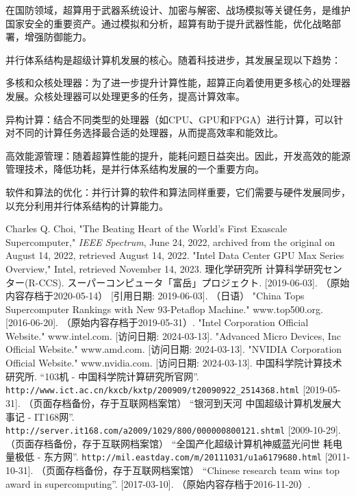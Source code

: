 \documentclass{ctexart}
\begin{document}
在国防领域，超算用于武器系统设计、加密与解密、战场模拟等关键任务，是维护国家安全的重要资产。通过模拟和分析，超算有助于提升武器性能，优化战略部署，增强防御能力。

并行体系结构是超级计算机发展的核心。随着科技进步，其发展呈现以下趋势：

多核和众核处理器：为了进一步提升计算性能，超算正向着使用更多核心的处理器发展。众核处理器可以处理更多的任务，提高计算效率。

异构计算：结合不同类型的处理器（如CPU、GPU和FPGA）进行计算，可以针对不同的计算任务选择最合适的处理器，从而提高效率和能效比。

高效能源管理：随着超算性能的提升，能耗问题日益突出。因此，开发高效的能源管理技术，降低功耗，是并行体系结构发展的一个重要方向。

软件和算法的优化：并行计算的软件和算法同样重要，它们需要与硬件发展同步，以充分利用并行体系结构的计算能力。
\begin{thebibliography}{99}
Charles Q. Choi, "The Beating Heart of the World's First Exascale Supercomputer," \textit{IEEE Spectrum}, June 24, 2022, archived from the original on August 14, 2022, retrieved August 14, 2022.
"Intel Data Center GPU Max Series Overview," Intel, retrieved November 14, 2023.
理化学研究所 计算科学研究センター(R-CCS). スーパーコンピュータ「富岳」プロジェクト. [2019-06-03]. （原始内容存档于2020-05-14） [引用日期: 2019-06-03]. （日语）
"China Tops Supercomputer Rankings with New 93-Petaflop Machine." www.top500.org. [2016-06-20]. （原始内容存档于2019-05-31）.
"Intel Corporation Official Website." www.intel.com. [访问日期: 2024-03-13].
"Advanced Micro Devices, Inc Official Website." www.amd.com. [访问日期: 2024-03-13].
"NVIDIA Corporation Official Website." www.nvidia.com. [访问日期: 2024-03-13].
中国科学院计算技术研究所. ``103机 - 中国科学院计算研究所官网''. \texttt{http://www.ict.ac.cn/kxcb/kxtp/200909/t20090922\_2514368.html} [2019-05-31]. （页面存档备份，存于互联网档案馆）
``银河到天河 中国超级计算机发展大事记 - IT168网''. \texttt{http://server.it168.com/a2009/1029/800/000000800121.shtml} [2009-10-29]. （页面存档备份，存于互联网档案馆）
``全国产化超级计算机神威蓝光问世 耗电量极低 - 东方网''. \texttt{http://mil.eastday.com/m/20111031/u1a6179680.html} [2011-10-31]. （页面存档备份，存于互联网档案馆）
``Chinese research team wins top award in supercomputing''. [2017-03-10]. （原始内容存档于2016-11-20）.
\end{thebibliography}
\end{document}
